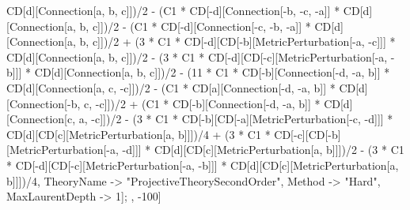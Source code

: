 CD[d][Connection[a, b, c]])/2 - (C1 * CD[-d][Connection[-b, -c, -a]] * CD[d][Connection[a, b, c]])/2 - (C1 * CD[-d][Connection[-c, -b, -a]] * CD[d][Connection[a, b, c]])/2 + (3 * C1 * CD[-d][CD[-b][MetricPerturbation[-a, -c]]] * CD[d][Connection[a, b, c]])/2 - (3 * C1 * CD[-d][CD[-c][MetricPerturbation[-a, -b]]] * CD[d][Connection[a, b, c]])/2 - (11 * C1 * CD[-b][Connection[-d, -a, b]] * CD[d][Connection[a, c, -c]])/2 - (C1 * CD[a][Connection[-d, -a, b]] * CD[d][Connection[-b, c, -c]])/2 + (C1 * CD[-b][Connection[-d, -a, b]] * CD[d][Connection[c, a, -c]])/2 - (3 * C1 * CD[-b][CD[-a][MetricPerturbation[-c, -d]]] * CD[d][CD[c][MetricPerturbation[a, b]]])/4 + (3 * C1 * CD[-c][CD[-b][MetricPerturbation[-a, -d]]] * CD[d][CD[c][MetricPerturbation[a, b]]])/2 - (3 * C1 * CD[-d][CD[-c][MetricPerturbation[-a, -b]]] * CD[d][CD[c][MetricPerturbation[a, b]]])/4, TheoryName -> "ProjectiveTheorySecondOrder", Method -> "Hard", MaxLaurentDepth -> 1]; , -100]